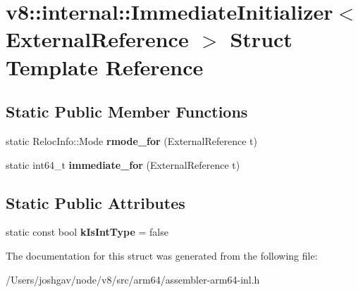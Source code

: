 \hypertarget{structv8_1_1internal_1_1_immediate_initializer_3_01_external_reference_01_4}{}\section{v8\+:\+:internal\+:\+:Immediate\+Initializer$<$ External\+Reference $>$ Struct Template Reference}
\label{structv8_1_1internal_1_1_immediate_initializer_3_01_external_reference_01_4}
\subsection*{Static Public Member Functions}
\begin{DoxyCompactItemize}
\item 
static Reloc\+Info\+::\+Mode {\bfseries rmode\+\_\+for} (External\+Reference t)\hypertarget{structv8_1_1internal_1_1_immediate_initializer_3_01_external_reference_01_4_a33bc1bc7a0f8a0ffc15645ff5386e791}{}\label{structv8_1_1internal_1_1_immediate_initializer_3_01_external_reference_01_4_a33bc1bc7a0f8a0ffc15645ff5386e791}

\item 
static int64\+\_\+t {\bfseries immediate\+\_\+for} (External\+Reference t)\hypertarget{structv8_1_1internal_1_1_immediate_initializer_3_01_external_reference_01_4_a4a97712bacf7929d298c1091bcc5cc46}{}\label{structv8_1_1internal_1_1_immediate_initializer_3_01_external_reference_01_4_a4a97712bacf7929d298c1091bcc5cc46}

\end{DoxyCompactItemize}
\subsection*{Static Public Attributes}
\begin{DoxyCompactItemize}
\item 
static const bool {\bfseries k\+Is\+Int\+Type} = false\hypertarget{structv8_1_1internal_1_1_immediate_initializer_3_01_external_reference_01_4_a82ac8f74395dad5916a560fa329e039b}{}\label{structv8_1_1internal_1_1_immediate_initializer_3_01_external_reference_01_4_a82ac8f74395dad5916a560fa329e039b}

\end{DoxyCompactItemize}


The documentation for this struct was generated from the following file\+:\begin{DoxyCompactItemize}
\item 
/\+Users/joshgav/node/v8/src/arm64/assembler-\/arm64-\/inl.\+h\end{DoxyCompactItemize}
